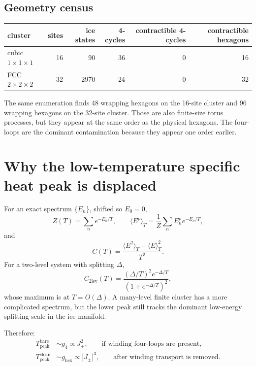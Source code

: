 \documentclass[11pt,letterpaper]{article}
\newcommand{\Jpm}{J_{\pm}}
\newcommand{\gfour}{g_4}
\newcommand{\ghex}{g_{\mathrm{hex}}}
\theoremstyle{plain}
\theoremstyle{definition}
\begin{document}
\subsection{Geometry census}

\begin{center}
\begin{tabular}{lrrrrr}
\toprule
cluster & sites & ice states & 4-cycles & contractible 4-cycles
& contractible hexagons \\
\midrule
cubic $1\times1\times1$ & 16 & 90 & 36 & 0 & 16 \\
FCC $2\times2\times2$ & 32 & 2970 & 24 & 0 & 32 \\
\bottomrule
\end{tabular}
\end{center}

The same enumeration finds 48 wrapping hexagons on the 16-site cluster and
96 wrapping hexagons on the 32-site cluster.  Those are also finite-size
torus processes, but they appear at the same order as the physical
hexagons.  The four-loops are the dominant contamination because they
appear one order earlier.

\section{Why the low-temperature specific heat peak is displaced}

For an exact spectrum $\{E_n\}$, shifted so $E_0=0$,
\begin{equation}
Z(T)=\sum_n e^{-E_n/T},\qquad
\langle E^p\rangle_T=\frac{1}{Z}\sum_n E_n^p e^{-E_n/T},
\end{equation}
and
\begin{equation}
C(T)=\frac{\langle E^2\rangle_T-\langle E\rangle_T^2}{T^2}.
\label{eq:specific_heat}
\end{equation}
For a two-level system with splitting $\Delta$,
\begin{equation}
C_{\mathrm{2lev}}(T)
=\frac{(\Delta/T)^2 e^{-\Delta/T}}
{\left(1+e^{-\Delta/T}\right)^2},
\end{equation}
whose maximum is at $T=O(\Delta)$.  A many-level finite cluster has a more
complicated spectrum, but the lower peak still tracks the dominant
low-energy splitting scale in the ice manifold.

Therefore:
\begin{align}
T_{\mathrm{peak}}^{\mathrm{bare}} &\sim \gfour\propto \Jpm^2,
\qquad\text{if winding four-loops are present},\\
T_{\mathrm{peak}}^{\mathrm{clean}} &\sim \ghex\propto |\Jpm|^3,
\qquad\text{after winding transport is removed}.
\end{align}
\end{document}
